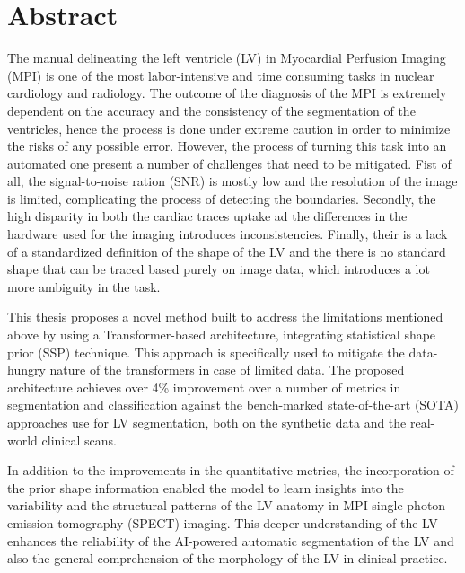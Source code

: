 \chapter*{Abstract}

The manual delineating the left ventricle (LV) in Myocardial Perfusion Imaging (MPI) is one of the most labor-intensive and time consuming tasks in nuclear cardiology and radiology. The outcome of the diagnosis of the MPI is extremely dependent on the accuracy and the consistency of the segmentation of the ventricles, hence the process is done under extreme caution in order to minimize the risks of any possible error. However, the process of turning this task into an automated one present a number of challenges that need to be mitigated. Fist of all, the signal-to-noise ration (SNR) is mostly low and the resolution of the image is limited, complicating the process of detecting the boundaries. Secondly, the high disparity in both the cardiac traces uptake ad the differences in the hardware used for the imaging introduces inconsistencies. Finally, their is a lack of a standardized definition of the shape of the LV and the there is no standard shape that can be traced based purely on image data, which introduces a lot more ambiguity in the task.

This thesis proposes a novel method built to address the limitations mentioned above by using a Transformer-based architecture, integrating statistical shape prior (SSP) technique. This approach is specifically used to mitigate the data-hungry nature of the transformers in case of limited data. The proposed architecture achieves over 4\% improvement over a number of metrics in segmentation and classification against the bench-marked state-of-the-art (SOTA) approaches use for LV segmentation, both on the synthetic data and the real-world clinical scans.

In addition to the improvements in the quantitative metrics, the incorporation of the prior shape information enabled the model to learn insights into the variability and the structural patterns of the LV anatomy in MPI single-photon emission tomography (SPECT) imaging. This deeper understanding of the LV enhances the reliability of the AI-powered automatic segmentation of the LV and also the general comprehension of the morphology of the LV in clinical practice.
